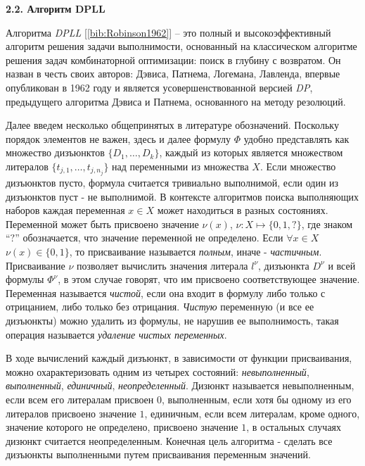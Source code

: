\vspace{5pt}
\textbf{2.2. Алгоритм DPLL}\label{chapters:2.2}
\vspace{5pt}

Алгоритма \textit{DPLL} [\ref{bib:Robinson1962}] – это полный и высокоэффективный алгоритм решения задачи выполнимости, основанный на классическом алгоритме решения задач комбинаторной оптимизации: поиск в глубину с возвратом. Он назван в честь своих авторов: Дэвиса, Патнема, Логемана, Лавленда, впервые опубликован в 1962 году и является усовершенствованной версией \textit{DP}, предыдущего алгоритма Дэвиса и Патнема, основанного на методу резолюций.

Далее введем несколько общепринятых в литературе обозначений. 
Поскольку порядок элементов не важен, здесь и далее формулу $\Phi$ удобно представлять как множество дизъюнктов $\{ D_1, \dots, D_k \}$, 
каждый из которых является множеством литералов $\{ t_{j,1}, \dots ,t_{j,n_j} \}$ над переменными из множества $X$. Если множество дизъюнктов пусто, формула считается тривиально выполнимой, если один из дизъюнктов пуст - не выполнимой.
В контексте алгоритмов поиска выполняющих наборов каждая переменная $x \in  X$ может находиться в разных состояниях. Переменной может быть присвоено значение $\nu(x)$, $\nu: X \mapsto \{ 0, 1, ?\}$, где знаком \enquote{$?$} обозначается, что значение переменной не определено. Если $\forall x \in X $ $\nu(x) \in \{ 0, 1\}$, то присваивание называется \textit{полным}, иначе - \textit{частичным}. Присваивание $\nu$ позволяет вычислить значения литерала $l^{\nu}$, дизъюнкта $D^{\nu}$ и всей формулы $\Phi^{\nu}$, в этом случае говорят, что им присвоено соответствующее значение. Переменная называется \textit{чистой}, 
если она входит в формулу либо только с отрицанием, либо только без отрицания. \textit{Чистую} переменную (и все ее дизъюнкты) можно удалить из формулы, не нарушив ее выполнимость, такая операция называется \textit{удаление чистых переменных}. 

В ходе вычислений каждый дизъюнкт, в зависимости от функции присваивания, можно охарактеризовать одним из четырех состояний: \textit{невыполненный}, \textit{выполненный}, \textit{единичный}, \textit{неопределенный}. Дизюнкт называется невыполненным, если всем его литералам присвоен $0$, выполненным, если хотя бы одному из его литералов присвоено значение $1$, единичным, если всем литералам, кроме одного, значение которого не определено, присвоено значение $1$, в остальных случаях дизюнкт считается неопределенным. Конечная цель алгоритма - сделать все дизъюнкты выполненными путем присваивания переменным значений.

